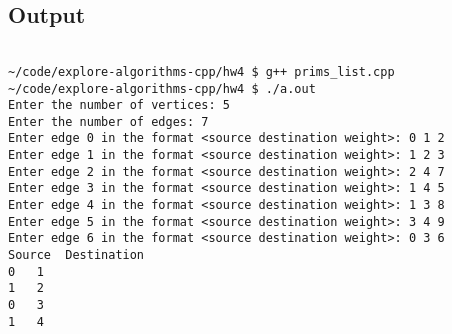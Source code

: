 \documentclass{article}
\begin{document}
\subsection{Output}

\begin{verbatim}

~/code/explore-algorithms-cpp/hw4 $ g++ prims_list.cpp
~/code/explore-algorithms-cpp/hw4 $ ./a.out 
Enter the number of vertices: 5
Enter the number of edges: 7
Enter edge 0 in the format <source destination weight>: 0 1 2
Enter edge 1 in the format <source destination weight>: 1 2 3
Enter edge 2 in the format <source destination weight>: 2 4 7
Enter edge 3 in the format <source destination weight>: 1 4 5
Enter edge 4 in the format <source destination weight>: 1 3 8
Enter edge 5 in the format <source destination weight>: 3 4 9
Enter edge 6 in the format <source destination weight>: 0 3 6
Source	Destination
0	1
1	2
0	3
1	4  
\end{verbatim}  
\end{document}

